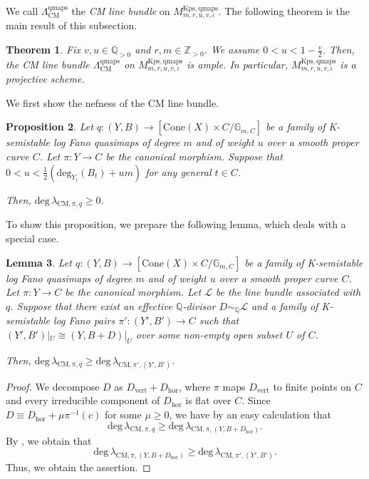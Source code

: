 \documentclass[12pt,twoside]{amsart}
\newtheorem{thm}{Theorem}[section]
\newtheorem{lem}[thm]{Lemma}
\newtheorem{prop}[thm]{Proposition}
\theoremstyle{definition}
\begin{document}
We call $\Lambda^{\mathrm{qmaps}}_{\mathrm{CM}}$ the {\em CM line bundle} on $M^{\mathrm{Kps,qmaps}}_{m,r,u,v,\iota}$. 
The following theorem is the main result of this subsection.
\begin{thm}\label{thm--projectivity}
Fix $v,u\in\mathbb{Q}_{>0}$ and $r,m\in\mathbb{Z}_{>0}$. 
We assume $0<u<1-\frac{v}{2}$. 
Then, the CM line bundle $\Lambda^{\mathrm{qmaps}}_{\mathrm{CM}}$ on $M^{\mathrm{Kps,qmaps}}_{m,r,u,v,\iota}$ is ample.
    In particular, $M^{\mathrm{Kps,qmaps}}_{m,r,u,v,\iota}$ is a projective scheme.
\end{thm}

We first show the nefness of the CM line bundle.

\begin{prop}\label{lem--CM-nefness}
Let $q\colon (Y,B)\to [\mathrm{Cone}(X)\times C/\mathbb{G}_{m,C}]$ be a family of K-semistable log Fano quasimaps of degree $m$ and of weight $u$ over a smooth proper curve $C$. Let $\pi\colon Y\to C$ be the canonical morphism.
Suppose that $0<u<\frac{1}{2}\left(\mathrm{deg}_{Y_t}(B_t)+um \right)$ for any general $t\in C$. 

Then, $\mathrm{deg}\,\lambda_{\mathrm{CM},\pi,q}\ge0$.
\end{prop}

To show this proposition, we prepare the following lemma, which deals with a special case.

\begin{lem}\label{lem--CM--minimization}
    Let $q\colon (Y,B)\to [\mathrm{Cone}(X)\times C/\mathbb{G}_{m,C}]$ be a family of K-semistable log Fano quasimaps of degree $m$ and of weight $u$ over a smooth proper curve $C$. Let $\pi\colon Y\to C$ be the canonical morphism.
Let $\mathscr{L}$ be the line bundle associated with $q$.
Suppose that there exist an effective $\mathbb{Q}$-divisor $D\sim_{\mathbb{Q}}\mathscr{L}$ and a family of K-semistable  log Fano pairs $\pi'\colon (Y',B')\to C$ such that $(Y',B')|_{U}\cong (Y,B+D)|_U$ over some non-empty open subset $U$ of $C$.

Then, $\mathrm{deg}\,\lambda_{\mathrm{CM},\pi,q}\ge\mathrm{deg}\,\lambda_{\mathrm{CM},\pi',(Y',B')}$.
\end{lem}

\begin{proof}
     We decompose $D$ as $D_{\mathrm{vert}}+D_{\mathrm{hor}}$, where $\pi$ maps $D_{\mathrm{vert}}$ to finite points on $C$ and every irreducible component of $D_{\mathrm{hor}}$ is flat over $C$.
    Since $D\equiv D_{\mathrm{hor}}+\mu \pi^{-1}(c)$ for some $\mu\ge0$, we have by an easy calculation that
    \[
    \mathrm{deg}\,\lambda_{\mathrm{CM},\pi,q}\ge\mathrm{deg}\,\lambda_{\mathrm{CM},\pi,(Y,B+D_{\mathrm{hor}})}.
    \]
    By \cite[Theorem 3.22]{CM}, we obtain that
    \[
   \mathrm{deg}\,\lambda_{\mathrm{CM},\pi,(Y,B+D_{\mathrm{hor}})}\ge\mathrm{deg}\,\lambda_{\mathrm{CM},\pi',(Y',B')}.
    \]
   Thus, we obtain the assertion.
\end{proof}
\end{document}
